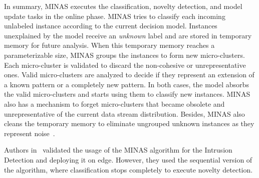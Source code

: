 In summary, MINAS executes the classification, novelty detection, and model update tasks in the online phase.
MINAS tries to classify each incoming unlabeled instance according to the current decision model. Instances unexplained by the model 
receive an \textit{unknown} label and are stored in temporary memory for future analysis. When this temporary memory reaches a parameterizable size, MINAS groups the instances to form new micro-clusters. Each micro-cluster is validated to discard the non-cohesive or unrepresentative ones. Valid micro-clusters are analyzed to decide if they represent an extension of a known pattern or a completely new pattern. In both cases, the model absorbs the valid micro-clusters and starts using them to classify new instances.
MINAS also has a mechanism to forget micro-clusters that became obsolete and unrepresentative of the current data stream distribution. 
Besides, MINAS also cleans the temporary memory to eliminate ungrouped unknown instances as they represent noise~\cite{Faria2016minas}.

Authors in~\cite{Cassales2019a} validated the usage of the MINAS algorithm for the Intrusion Detection and deploying it on edge. However, they used the sequential version of the algorithm, where classification stops completely to execute novelty detection.

